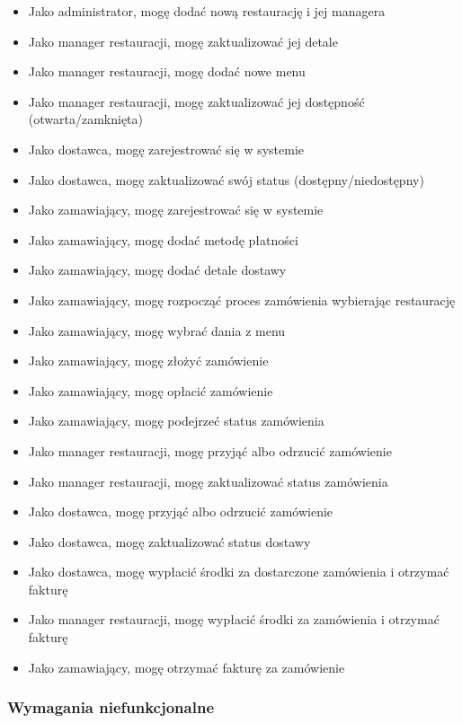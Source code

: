 \begin{itemize}
    \item Jako administrator, mogę dodać nową restaurację i jej managera
    \item Jako manager restauracji, mogę zaktualizować jej detale
    \item Jako manager restauracji, mogę dodać nowe menu
    \item Jako manager restauracji, mogę zaktualizować jej dostępność (otwarta/zamknięta)
    \item Jako dostawca, mogę zarejestrować się w systemie
    \item Jako dostawca, mogę zaktualizować swój status (dostępny/niedostępny)
    \item Jako zamawiający, mogę zarejestrować się w systemie
    \item Jako zamawiający, mogę dodać metodę płatności
    \item Jako zamawiający, mogę dodać detale dostawy
    \item Jako zamawiający, mogę rozpocząć proces zamówienia wybierając restaurację
    \item Jako zamawiający, mogę wybrać dania z menu
    \item Jako zamawiający, mogę złożyć zamówienie
    \item Jako zamawiający, mogę opłacić zamówienie
    \item Jako zamawiający, mogę podejrzeć status zamówienia
    \item Jako manager restauracji, mogę przyjąć albo odrzucić zamówienie
    \item Jako manager restauracji, mogę zaktualizować status zamówienia
    \item Jako dostawca, mogę przyjąć albo odrzucić zamówienie
    \item Jako dostawca, mogę zaktualizować status dostawy
    \item Jako dostawca, mogę wypłacić środki za dostarczone zamówienia i otrzymać fakturę
    \item Jako manager restauracji, mogę wypłacić środki za zamówienia i otrzymać fakturę
    \item Jako zamawiający, mogę otrzymać fakturę za zamówienie
\end{itemize}

\subsubsection{Wymagania niefunkcjonalne}


